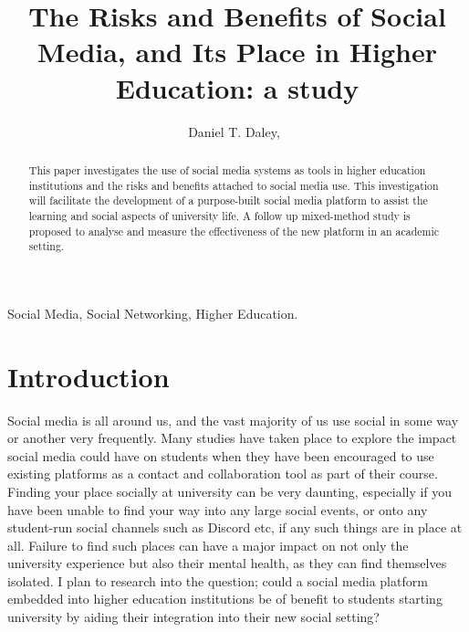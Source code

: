 \documentclass[lettersize,journal]{IEEEtran}
\begin{document}
\title{The Risks and Benefits of Social Media, and Its Place in Higher Education: a study}

\author{Daniel T. Daley,~}




\maketitle
\begin{abstract}
	This paper investigates the use of social media systems as tools in higher education 
	institutions and the risks and benefits attached to social media use. This investigation will 
	facilitate the development of a purpose-built social media platform to assist the learning and social
	aspects of university life. A follow up mixed-method study is proposed to analyse and measure the effectiveness of
	the new platform in an academic setting.
\end{abstract}

\begin{IEEEkeywords}
Social Media, Social Networking, Higher Education.
\end{IEEEkeywords}

\section{Introduction}
	Social media is all around us, and the vast majority of us use social in some way or another very
	frequently. Many studies have taken place to explore the impact social media could have on students
	when they have been encouraged to use existing platforms as a contact and collaboration tool as part
	of their course. 
    Finding your place socially at university can be very daunting, especially if you have been unable to find
    your way into any large social events, or onto any student-run social channels such as Discord \cite{Discord} etc, if any
    such things are in place at all. Failure to find such places can have a major impact on not only the university
    experience but also their mental health, as they can find themselves isolated. I plan to research into the
    question; could a social media platform embedded into higher education institutions be of benefit to students
    starting university by aiding their integration into their new social setting?
\end{document}
